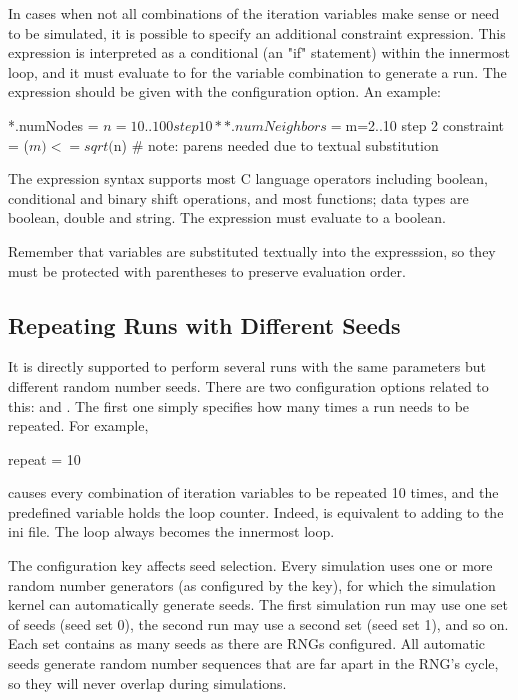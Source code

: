 In cases when not all combinations of the iteration variables make sense
or need to be simulated, it is possible to specify an additional
constraint expression. This expression is interpreted as a conditional
(an "if" statement) within the innermost
loop, and it must evaluate to  for
the variable combination to generate a run. The expression should be
given with the  configuration option. An example:

\begin{inifile}
*.numNodes = ${n=10..100 step 10}
**.numNeighbors = ${m=2..10 step 2}
constraint = ($m) <= sqrt($n)  # note: parens needed due to textual substitution
\end{inifile}

The expression syntax supports most C language operators including boolean,
conditional and binary shift operations, and most  functions;
data types are boolean, double and string. The expression must evaluate to
a boolean.

\begin{note}
Remember that variables are substituted textually into the expresssion, so
they must be protected with parentheses to preserve evaluation order.
\end{note}


\subsection{Repeating Runs with Different Seeds}

It is directly supported to perform several runs with the same
parameters but different random number seeds. There are two
configuration options related to this:  and .
The first one simply specifies how many times a run needs to be repeated. For
example,

\begin{inifile}
repeat = 10
\end{inifile}

causes every combination of iteration variables to be repeated 10 times,
and the  predefined variable holds the loop counter.
Indeed,  is equivalent to adding 
to the ini file. The  loop always becomes the innermost loop.

The  configuration key affects seed selection. Every
simulation uses one or more random number generators (as configured by
the  key), for which the simulation kernel can automatically
generate seeds. The first simulation run may use one set of seeds (seed
set 0), the second run may use a second set (seed set 1), and so on.
Each set contains as many seeds as there are RNGs configured. All
automatic seeds generate random number sequences that are far apart in
the RNG's cycle, so they will never overlap during
simulations.

